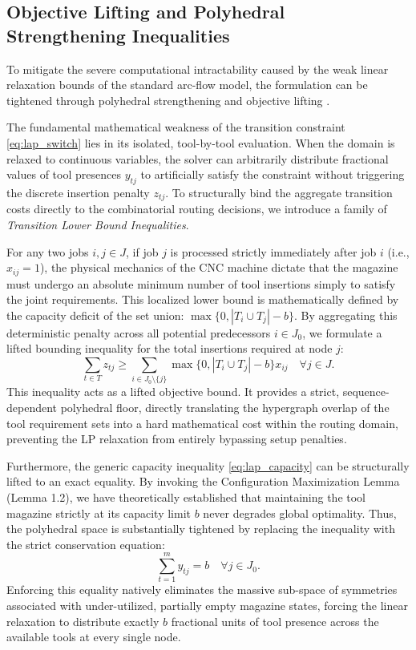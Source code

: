 \documentclass[11pt, a4paper]{book}
\begin{document}
	\subsection{Objective Lifting and Polyhedral Strengthening Inequalities}
	
	To mitigate the severe computational intractability caused by the weak linear relaxation bounds of the standard arc-flow model, the formulation can be tightened through polyhedral strengthening and objective lifting \cite{Laporte2004}. 
	
	The fundamental mathematical weakness of the transition constraint \eqref{eq:lap_switch} lies in its isolated, tool-by-tool evaluation. When the domain is relaxed to continuous variables, the solver can arbitrarily distribute fractional values of tool presences $y_{tj}$ to artificially satisfy the constraint without triggering the discrete insertion penalty $z_{tj}$. To structurally bind the aggregate transition costs directly to the combinatorial routing decisions, we introduce a family of \textit{Transition Lower Bound Inequalities}.
	
	For any two jobs $i, j \in J$, if job $j$ is processed strictly immediately after job $i$ (i.e., $x_{ij} = 1$), the physical mechanics of the CNC machine dictate that the magazine must undergo an absolute minimum number of tool insertions simply to satisfy the joint requirements. This localized lower bound is mathematically defined by the capacity deficit of the set union: $\max\{0, |T_i \cup T_j| - b\}$. By aggregating this deterministic penalty across all potential predecessors $i \in J_0$, we formulate a lifted bounding inequality for the total insertions required at node $j$:
	\begin{equation}
		\sum_{t \in T} z_{tj} \ge \sum_{i \in J_0 \setminus \{j\}} \max\{0, |T_i \cup T_j| - b\} x_{ij} \quad \forall j \in J. \label{eq:lap_trans_bound}
	\end{equation}
	This inequality acts as a lifted objective bound. It provides a strict, sequence-dependent polyhedral floor, directly translating the hypergraph overlap of the tool requirement sets into a hard mathematical cost within the routing domain, preventing the LP relaxation from entirely bypassing setup penalties.
	
	Furthermore, the generic capacity inequality \eqref{eq:lap_capacity} can be structurally lifted to an exact equality. By invoking the Configuration Maximization Lemma (Lemma 1.2), we have theoretically established that maintaining the tool magazine strictly at its capacity limit $b$ never degrades global optimality. Thus, the polyhedral space is substantially tightened by replacing the inequality with the strict conservation equation:
	\begin{equation}
		\sum_{t=1}^{m} y_{tj} = b \quad \forall j \in J_0. \label{eq:lap_cap_eq}
	\end{equation}
	Enforcing this equality natively eliminates the massive sub-space of symmetries associated with under-utilized, partially empty magazine states, forcing the linear relaxation to distribute exactly $b$ fractional units of tool presence across the available tools at every single node.
	
\end{document}
